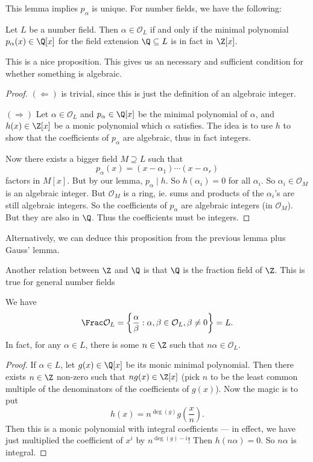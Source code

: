 \documentclass[a4paper]{article}
\begin{document}
This lemma implies $p_\alpha$ is unique. For number fields, we have the following:
\begin{prop}
  Let $L$ be a number field. Then $\alpha \in \mathcal{O}_L$ if and only if the minimal polynomial $p_\alpha(x) \in \Q[x]$ for the field extension $\Q \subseteq L$ is in fact in $\Z[x]$.
\end{prop}
This is a nice proposition. This gives us an necessary and sufficient condition for whether something is algebraic.
\begin{proof}
  $(\Leftarrow)$ is trivial, since this is just the definition of an algebraic integer.

  $(\Rightarrow)$ Let $\alpha \in \mathcal{O}_L$ and $p_\alpha \in \Q[x]$ be the minimal polynomial of $\alpha$, and $h(x) \in \Z[x]$ be a monic polynomial which $\alpha$ satisfies. The idea is to use $h$ to show that the coefficients of $p_\alpha$ are algebraic, thus in fact integers.

  Now there exists a bigger field $M \supseteq L$ such that
  \[
    p_\alpha(x) = (x - \alpha_1) \cdots (x - \alpha_r)
  \]
  factors in $M[x]$. But by our lemma, $p_\alpha \mid h$. So $h(\alpha_i) = 0$ for all $\alpha_i$. So $\alpha_i \in \mathcal{O}_M$ is an algebraic integer. But $\mathcal{O}_M$ is a ring, ie. sums and products of the $\alpha_i$'s are still algebraic integers. So the coefficients of $p_\alpha$ are algebraic integers (in $\mathcal{O}_M$). But they are also in $\Q$. Thus the coefficients must be integers.
\end{proof}
Alternatively, we can deduce this proposition from the previous lemma plus Gauss' lemma.

Another relation between $\Z$ and $\Q$ is that $\Q$ is the fraction field of $\Z$. This is true for general number fields
\begin{lemma}
  We have
  \[
    \Frac \mathcal{O}_L = \left\{\frac{\alpha}{\beta}: \alpha, \beta \in \mathcal{O}_L, \beta \not= 0\right\} = L.
  \]
  In fact, for any $\alpha \in L$, there is some $n \in \Z$ such that $n\alpha \in \mathcal{O}_L$.
\end{lemma}

\begin{proof}
  If $\alpha \in L$, let $g(x) \in \Q[x]$ be its monic minimal polynomial. Then there exists $n \in \Z$ non-zero such that $ng(x) \in \Z[x]$ (pick $n$ to be the least common multiple of the denominators of the coefficients of $g(x)$). Now the magic is to put
  \[
    h(x) = n^{\deg(g)}g\left(\frac{x}{n}\right).
  \]
  Then this is a monic polynomial with integral coefficients --- in effect, we have just multiplied the coefficient of $x^i$ by $n^{\deg(g) - i}$! Then $h(n\alpha) = 0$. So $n\alpha$ is integral.
\end{proof}
\end{document}
